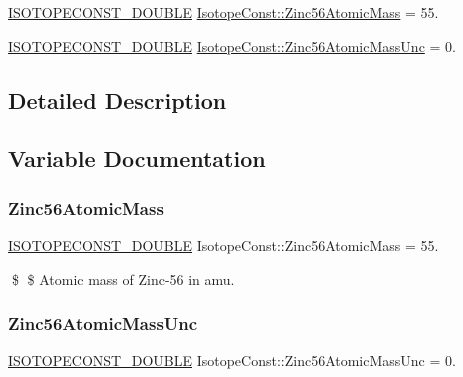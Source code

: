 \begin{DoxyCompactItemize}
\item 
\mbox{\hyperlink{group___isotope_const-_macros_ga8f45a7272ce02c0b4c65c44636ed719a}{I\+S\+O\+T\+O\+P\+E\+C\+O\+N\+S\+T\+\_\+\+D\+O\+U\+B\+LE}} \mbox{\hyperlink{group___isotope_const-_zinc-_zn56_ga16776e1504b047a6ac4f0367bef1de22}{Isotope\+Const\+::\+Zinc56\+Atomic\+Mass}} = 55.
\item 
\mbox{\hyperlink{group___isotope_const-_macros_ga8f45a7272ce02c0b4c65c44636ed719a}{I\+S\+O\+T\+O\+P\+E\+C\+O\+N\+S\+T\+\_\+\+D\+O\+U\+B\+LE}} \mbox{\hyperlink{group___isotope_const-_zinc-_zn56_ga52622907a5980dc6c4b910e375b569ea}{Isotope\+Const\+::\+Zinc56\+Atomic\+Mass\+Unc}} = 0.
\end{DoxyCompactItemize}


\subsection{Detailed Description}


\subsection{Variable Documentation}
\mbox{\label{group___isotope_const-_zinc-_zn56_ga16776e1504b047a6ac4f0367bef1de22}} 
\subsubsection{\texorpdfstring{Zinc56\+Atomic\+Mass}{Zinc56AtomicMass}}
{\footnotesize\ttfamily \mbox{\hyperlink{group___isotope_const-_macros_ga8f45a7272ce02c0b4c65c44636ed719a}{I\+S\+O\+T\+O\+P\+E\+C\+O\+N\+S\+T\+\_\+\+D\+O\+U\+B\+LE}} Isotope\+Const\+::\+Zinc56\+Atomic\+Mass = 55.}

\$ \$ Atomic mass of Zinc-\/56 in amu. \mbox{\label{group___isotope_const-_zinc-_zn56_ga52622907a5980dc6c4b910e375b569ea}} 
\subsubsection{\texorpdfstring{Zinc56\+Atomic\+Mass\+Unc}{Zinc56AtomicMassUnc}}
{\footnotesize\ttfamily \mbox{\hyperlink{group___isotope_const-_macros_ga8f45a7272ce02c0b4c65c44636ed719a}{I\+S\+O\+T\+O\+P\+E\+C\+O\+N\+S\+T\+\_\+\+D\+O\+U\+B\+LE}} Isotope\+Const\+::\+Zinc56\+Atomic\+Mass\+Unc = 0.}

